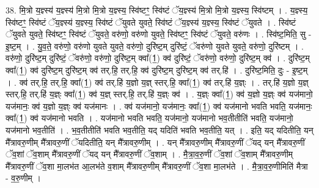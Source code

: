 \documentclass[17pt]{extarticle}
\begin{document}
38. मि॒त्रो य॒ज्ञ्स्य॑ य॒ज्ञ्स्य॑ मि॒त्रो मि॒त्रो य॒ज्ञ्स्य॒ स्वि॑ष्टꣳ॒॒ स्वि॑ष्टं ॅय॒ज्ञ्स्य॑ मि॒त्रो मि॒त्रो य॒ज्ञ्स्य॒ स्वि॑ष्टम् । . य॒ज्ञ्स्य॒ स्वि॑ष्टꣳ॒॒ स्वि॑ष्टं ॅय॒ज्ञ्स्य॑ य॒ज्ञ्स्य॒ स्वि॑ष्टं ॅयुवते युवते॒ स्वि॑ष्टं ॅय॒ज्ञ्स्य॑ य॒ज्ञ्स्य॒ स्वि॑ष्टं ॅयुवते । . स्वि॑ष्टं ॅयुवते युवते॒ स्वि॑ष्टꣳ॒॒ स्वि॑ष्टं ॅयुवते॒ वरु॑णो॒ वरु॑णो युवते॒ स्वि॑ष्टꣳ॒॒ स्वि॑ष्टं ॅयुवते॒ वरु॑णः । . स्वि॑ष्ट॒मिति॒ सु - इ॒ष्ट॒म् । . यु॒व॒ते॒ वरु॑णो॒ वरु॑णो युवते युवते॒ वरु॑णो॒ दुरि॑ष्ट॒म् दुरि॑ष्टं॒ ॅवरु॑णो युवते युवते॒ वरु॑णो॒ दुरि॑ष्टम् । . वरु॑णो॒ दुरि॑ष्ट॒म् दुरि॑ष्टं॒ ॅवरु॑णो॒ वरु॑णो॒ दुरि॑ष्ट॒म् क्वा᳚(1॒) क्व॑ दुरि॑ष्टं॒ ॅवरु॑णो॒ वरु॑णो॒ दुरि॑ष्ट॒म् क्व॑ । . दुरि॑ष्ट॒म् क्वा᳚(1॒) क्व॑ दुरि॑ष्ट॒म् दुरि॑ष्ट॒म् क्व॑ तर्.हि॒ तर्.हि॒ क्व॑ दुरि॑ष्ट॒म् दुरि॑ष्ट॒म् क्व॑ तर्.हि॑ । . दुरि॑ष्ट॒मिति॒ दुः - इ॒ष्ट॒म् । . क्व॑ तर्.हि॒ तर्.हि॒ क्वा᳚(1॒) क्व॑ तर्.हि॑ य॒ज्ञो य॒ज्ञ् स्तर्.हि॒ क्वा᳚(1॒) क्व॑ तर्.हि॑ य॒ज्ञ्ः । . तर्.हि॑ य॒ज्ञो य॒ज्ञ् स्तर्.हि॒ तर्.हि॑ य॒ज्ञ्ः क्वा᳚(1॒) क्व॑ य॒ज्ञ् स्तर्.हि॒ तर्.हि॑ य॒ज्ञ्ः क्व॑ । . य॒ज्ञ्ः क्वा᳚(1॒) क्व॑ य॒ज्ञो य॒ज्ञ्ः क्व॑ यज॑मानो॒ यज॑मानः॒ क्व॑ य॒ज्ञो य॒ज्ञ्ः क्व॑ यज॑मानः । . क्व॑ यज॑मानो॒ यज॑मानः॒ क्वा᳚(1॒) क्व॑ यज॑मानो भवति भवति॒ यज॑मानः॒ क्वा᳚(1॒) क्व॑ यज॑मानो भवति । . यज॑मानो भवति भवति॒ यज॑मानो॒ यज॑मानो भव॒तीतीति॑ भवति॒ यज॑मानो॒ यज॑मानो भव॒तीति॑ । . भ॒व॒तीतीति॑ भवति भव॒तीति॒ यद् यदिति॑ भवति भव॒तीति॒ यत् । . इति॒ यद् यदितीति॒ यन् मै᳚त्रावरु॒णीम् मै᳚त्रावरु॒णीं ॅयदितीति॒ यन् मै᳚त्रावरु॒णीम् । . यन् मै᳚त्रावरु॒णीम् मै᳚त्रावरु॒णीं ॅयद् यन् मै᳚त्रावरु॒णीं ॅव॒शां ॅव॒शाम् मै᳚त्रावरु॒णीं ॅयद् यन् मै᳚त्रावरु॒णीं ॅव॒शाम् । . मै॒त्रा॒व॒रु॒णीं ॅव॒शां ॅव॒शाम् मै᳚त्रावरु॒णीम् मै᳚त्रावरु॒णीं ॅव॒शा मा॒लभ॑त आ॒लभ॑ते व॒शाम् मै᳚त्रावरु॒णीम् मै᳚त्रावरु॒णीं ॅव॒शा मा॒लभ॑ते । . मै॒त्रा॒व॒रु॒णीमिति॑ मैत्रा - व॒रु॒णीम् । \newline
\end{document}
